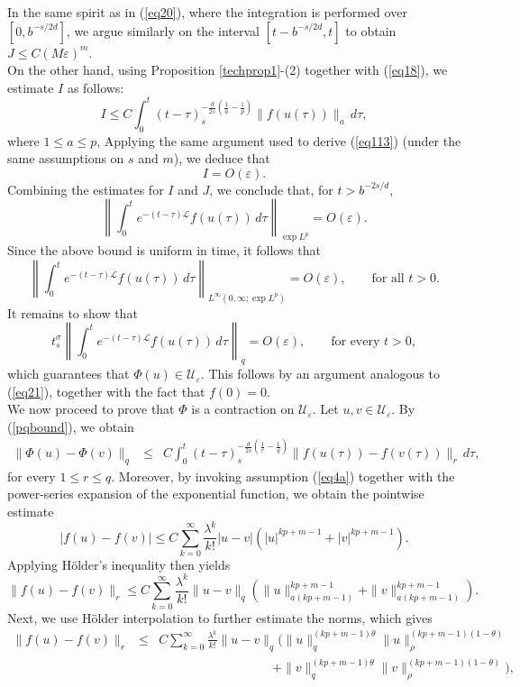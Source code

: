 \documentclass[a4paper,11pt]{amsart}
\renewcommand\eqref[1]{(\ref{#1})} %
\numberwithin{equation}{section}
\theoremstyle{plain}
\theoremstyle{definition}
\begin{document}
In the same spirit as in  \eqref{eq20}, where the integration is performed over $[0,b^{-s/2d}]$, we argue similarly on the interval $[t-b^{-s/2d},t]$ to obtain $J \leq C(M\varepsilon)^m.$\\
 On the other hand, using Proposition \ref{techprop1}-(2) together with \eqref{eq18}, we estimate $I$ as follows:
$$
I \leq
C \int_0^{t}
(t-\tau)_s^{-\frac{d}{2s}\left(\frac{1}{a}-\frac{1}{p}\right)}
\|f(u(\tau))\|_{a}\,d\tau,
$$
where $1\leq a\leq p$,  Applying the same argument used to derive \eqref{eq113} (under the same assumptions on $s$ and $m$), we deduce that
\[
I = O(\varepsilon).
\]
Combining the estimates for $I$ and $J$, we conclude that, for $t>b^{-2s/d}$,
\[
\left\|\int_0^t e^{-(t-\tau)\mathcal{L}} f(u(\tau))\,d\tau
\right\|_{\exp L^p}
= O(\varepsilon).
\]
Since the above bound is uniform in time, it follows that
\[
\left\|\int_0^t e^{-(t-\tau)\mathcal{L}} f(u(\tau))\,d\tau
\right\|_{L^\infty(0,\infty;\exp L^p)}
= O(\varepsilon),
\qquad \text{for all } t>0.
\]
It remains to show that
\[
t_s^\sigma
\left\|
\int_0^t e^{-(t-\tau)\mathcal{L}} f(u(\tau))\,d\tau
\right\|_{q}
= O(\varepsilon),
\qquad \text{for every } t>0,
\]
which guarantees that $\Phi(u)\in \mathcal{U}_\varepsilon$. This follows by an argument analogous to \eqref{eq21}, together with the fact that $f(0)=0$.\\
We now proceed to prove that $\Phi$ is a contraction on $\mathcal{U}_{\varepsilon}$. Let $u,v\in \mathcal{U}_\varepsilon$. By \eqref{pqbound}, we obtain
\begin{eqnarray*}
\|\Phi(u)-\Phi(v)\|_{q}
&\leq&
C\int_0^t
(t-\tau)_s^{-\frac{d}{2 s}\left(\frac{1}{r}-\frac{1}{q}\right)}
\|f(u(\tau))-f(v(\tau))\|_{r}
\,d\tau,
\end{eqnarray*}
for every $1\leq r\leq q$. Moreover, by invoking assumption \eqref{eq4a} together with the power-series expansion of the exponential function, we obtain the pointwise estimate
$$
|f(u)-f(v)|
\le C \sum_{k=0}^{\infty}
\frac{\lambda^k}{k!}
|u-v|
\left(
|u|^{kp+m-1}
+
|v|^{kp+m-1}
\right).
$$
Applying H\"older's inequality then yields
$$
\|f(u)-f(v)\|_{r}
\leq C\sum_{k=0}^{\infty}\frac{\lambda^k}{k!}
\|u-v\|_{q}
\left(
\|u\|_{{a(kp+m-1)}}^{kp+m-1}
+
\|v\|_{{a(kp+m-1)}}^{kp+m-1}
\right).
$$
Next, we use H\"older interpolation to further estimate the norms, which gives
\begin{eqnarray*}
\|f(u)-f(v)\|_{r}
&\leq&
C\sum_{k=0}^{\infty}\frac{\lambda^k}{k!}
\|u-v\|_{q}
\Big(
\|u\|_{q}^{(kp+m-1)\theta}
\|u\|_{\rho}^{(kp+m-1)(1-\theta)}
\\
&&\qquad\qquad\qquad\qquad\quad
+
\|v\|_{q}^{(kp+m-1)\theta}
\|v\|_{\rho}^{(kp+m-1)(1-\theta)}
\Big),
\end{eqnarray*}
\end{document}

